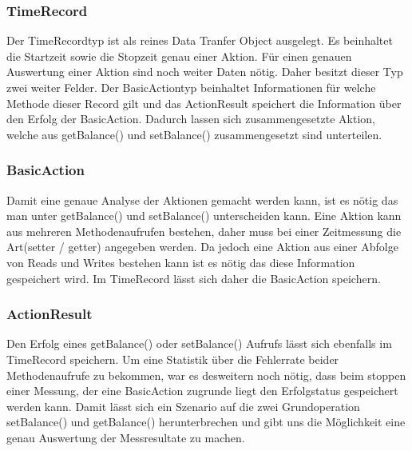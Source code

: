 \subsubsection{TimeRecord}
\label{sec:timeRecord}
Der TimeRecordtyp ist als reines Data Tranfer Object ausgelegt. Es beinhaltet die Startzeit sowie die Stopzeit genau einer Aktion. Für einen genauen Auswertung einer Aktion sind noch weiter Daten nötig. Daher besitzt dieser Typ zwei weiter Felder. Der BasicActiontyp beinhaltet Informationen für welche Methode dieser Record gilt und das ActionResult speichert die Information über den Erfolg der BasicAction. Dadurch lassen sich zusammengesetzte Aktion, welche aus getBalance() und setBalance() zusammengesetzt sind unterteilen.

\subsubsection{BasicAction}
\label{sec:BasicAction}
Damit eine genaue Analyse der Aktionen gemacht werden kann, ist es nötig das man unter getBalance() und setBalance() unterscheiden kann. Eine Aktion kann aus mehreren Methodenaufrufen bestehen, daher muss bei einer Zeitmessung die Art(setter / getter) angegeben werden. Da jedoch eine Aktion aus einer Abfolge von Reads und Writes bestehen kann ist es nötig das diese Information gespeichert wird. Im TimeRecord lässt sich daher die BasicAction speichern.

\subsubsection{ActionResult}
\label{sec:ActionResult}
Den Erfolg eines getBalance() oder setBalance() Aufrufs lässt sich ebenfalls im TimeRecord speichern. Um eine Statistik über die Fehlerrate beider Methodenaufrufe zu bekommen, war es desweitern noch nötig, dass beim stoppen einer Messung, der eine BasicAction zugrunde liegt den Erfolgstatus gespeichert werden kann. Damit lässt sich ein Szenario auf die zwei Grundoperation setBalance() und getBalance() herunterbrechen und gibt uns die Möglichkeit eine genau Auswertung der Messresultate zu machen.

